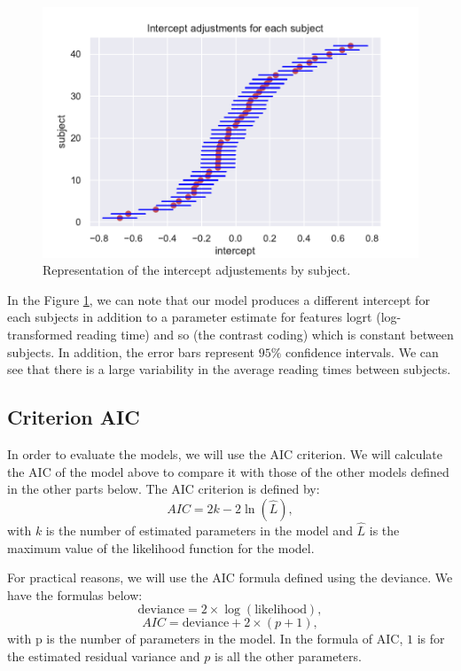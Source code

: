 \documentclass{article}
\begin{document}
\begin{figure}[H]
    \centering
    \includegraphics[scale=.65]{./images/model1_inter.pdf}
    \caption{Representation of the intercept adjustements by subject.}
    \label{fig:model1}
\end{figure}

In the Figure \ref{fig:model1}, we can note that our model produces a different intercept for each subjects in addition to a parameter estimate for features logrt (log-transformed reading time) and so (the contrast coding) which is constant between subjects. In addition, the error bars represent $95\%$ confidence intervals. We can see that there is a large variability in the average reading times between subjects.

 \subsection{Criterion AIC}
In order to evaluate the models, we will use the AIC criterion.
We will calculate the AIC of the model above to compare it with those of the other models defined in the other parts below. The AIC criterion is defined by:
\[ AIC = 2k - 2\ln({\hat{L}}),\]
with  $k$ is the number of estimated parameters in the model and $\hat{L}$ is the maximum value of the likelihood function for the model.


For practical reasons, we will use the AIC formula defined using the deviance.
We have the formulas below:
$$\text{deviance}= 2 \times \log(\text{likelihood}),$$ 
$$AIC=\text{deviance} + 2 \times (p+1),$$
with p is the number of parameters in the model. In the formula of AIC, $1$ is for the estimated residual variance and $p$ is all the other parameters.
\end{document}
